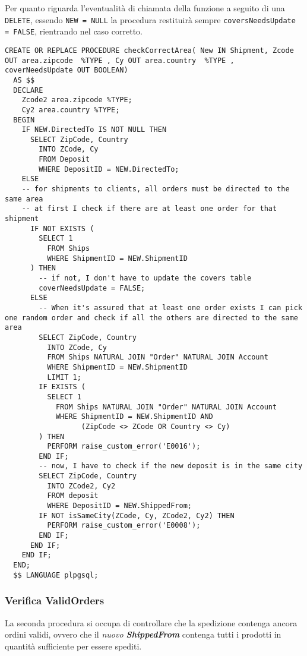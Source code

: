 Per quanto riguarda l'eventualità di chiamata della funzione a seguito di una \lstinline{DELETE}, essendo \lstinline{NEW = NULL} la procedura restituirà sempre \lstinline{coversNeedsUpdate = FALSE}, rientrando nel caso corretto.
\newpage
\begin{lstlisting}[caption={Procedure \textbf{checkCorrectArea}}]
  CREATE OR REPLACE PROCEDURE checkCorrectArea( New IN Shipment, Zcode OUT area.zipcode  %TYPE , Cy OUT area.country  %TYPE , coverNeedsUpdate OUT BOOLEAN)
  AS $$
  DECLARE
    Zcode2 area.zipcode %TYPE;
    Cy2 area.country %TYPE;
  BEGIN 
    IF NEW.DirectedTo IS NOT NULL THEN
      SELECT ZipCode, Country 
        INTO ZCode, Cy
        FROM Deposit
        WHERE DepositID = NEW.DirectedTo;
    ELSE
    -- for shipments to clients, all orders must be directed to the same area
    -- at first I check if there are at least one order for that shipment
      IF NOT EXISTS (
        SELECT 1
          FROM Ships 
          WHERE ShipmentID = NEW.ShipmentID
      ) THEN
        -- if not, I don't have to update the covers table
        coverNeedsUpdate = FALSE;
      ELSE
        -- When it's assured that at least one order exists I can pick one random order and check if all the others are directed to the same area
        SELECT ZipCode, Country 
          INTO ZCode, Cy
          FROM Ships NATURAL JOIN "Order" NATURAL JOIN Account
          WHERE ShipmentID = NEW.ShipmentID
          LIMIT 1;
        IF EXISTS (
          SELECT 1
            FROM Ships NATURAL JOIN "Order" NATURAL JOIN Account
            WHERE ShipmentID = NEW.ShipmentID AND
                  (ZipCode <> ZCode OR Country <> Cy)
        ) THEN
          PERFORM raise_custom_error('E0016');
        END IF;
        -- now, I have to check if the new deposit is in the same city
        SELECT ZipCode, Country 
          INTO ZCode2, Cy2
          FROM deposit
          WHERE DepositID = NEW.ShippedFrom;
        IF NOT isSameCity(ZCode, Cy, ZCode2, Cy2) THEN
          PERFORM raise_custom_error('E0008');
        END IF;
      END IF;
    END IF;
  END;
  $$ LANGUAGE plpgsql;
\end{lstlisting}

\subsubsection{Verifica ValidOrders}

La seconda procedura si occupa di controllare che la spedizione contenga ancora ordini validi, ovvero che il \textit{nuovo \textbf{ShippedFrom}} contenga tutti i prodotti in quantità sufficiente per essere spediti.

